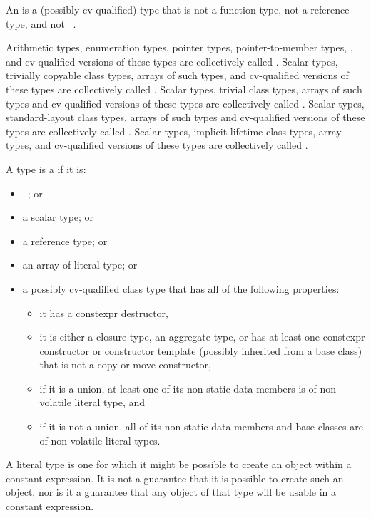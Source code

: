 \pnum
An  is a (possibly cv-qualified) type that is not
a function type, not a reference type, and not \cv{}~.

\pnum
{}%
%
%
Arithmetic types, enumeration types,
pointer types, pointer-to-member types,
,
and
cv-qualified versions of these
types are collectively called
.
Scalar types, trivially copyable class types,
arrays of such types, and cv-qualified versions of these
types are collectively called .
Scalar types, trivial class types,
arrays of such types and cv-qualified versions of these
types are collectively called
. Scalar types, standard-layout class
types, arrays of such types and
cv-qualified versions of these types
are collectively called .
Scalar types, implicit-lifetime class types,
array types, and cv-qualified versions of these types
are collectively called .

\pnum
A type is a  if it is:
\begin{itemize}
\item \cv{}~; or
\item a scalar type; or
\item a reference type; or
\item an array of literal type; or
\item a possibly cv-qualified class type that
has all of the following properties:
\begin{itemize}
\item it has a constexpr destructor,
\item it is either a closure type,
an aggregate type, or
has at least one constexpr constructor or constructor template
(possibly inherited from a base class)
that is not a copy or move constructor,
\item if it is a union, at least one of its non-static data members is
of non-volatile literal type, and
\item if it is not a union, all of its non-static data members and base classes are
of non-volatile literal types.
\end{itemize}
\end{itemize}
\begin{note}
A literal type is one for which
it might be possible to create an object
within a constant expression.
It is not a guarantee that it is possible to create such an object,
nor is it a guarantee that any object of that type
will be usable in a constant expression.
\end{note}

